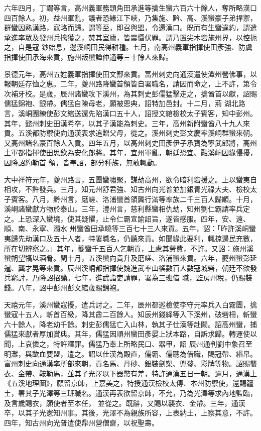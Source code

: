\begin{pinyinscope}
 六年四月，丁謂等言，高州義軍務頭角田承進等擒生蠻六百六十餘人，奪所略漢口四百餘人。初，益州軍亂，議者恐緣江下峽，乃集施、黔、高、溪蠻豪子弟捍禦，群蠻因熟漢路，寇略而歸。謂等至，即召與盟，令還漢口。既而有生蠻違約，謂遣承進率眾及發州兵擒獲之，焚其室廬，皆震懾伏罪。謂乃置尖木砦施州界，以控扼之，自是寇
 鈔始息，邊溪峒田民得耕種。七月，南高州義軍指揮使田彥強、防虞指揮使田承海來貢，施州叛蠻譚仲通等三十餘人來歸。



 景德元年，高州五姓義軍指揮使田文鄯來貢。富州刺史向通漢遣使潭州營佛事，以報朝廷存恤之惠。二年，夔州路降蠻首領皆自署職名，請因而命之，上不許，第令次補牙校。是歲，辰州諸蠻攻下溪州，為其刺史彭儒猛擊走之，擒酋首以獻，詔賜儒猛錦袍、銀帶。儒猛自陳母老，願被恩典，詔特加邑封。十二月，荊
 湖北路言，溪峒團練使彭文綰送還先陷漢口五十人，詔授文綰檢校太子賓客，知中彭州。其年，懿州刺史田漢希卒，以其子漢能為刺史。三年，高州新附蠻酋八十九人來貢。五溪都防禦使向通漢表求追贈父母，從之。溪州刺史彭文慶率溪峒群蠻來朝。又高州諸名豪百餘人入貢。四年五月，以高州刺史田彥伊子承寶為寧武郎將，高州土軍都指揮使田思欽為安化郎將。其年，宜州軍亂，朝廷恐宜、融溪峒因緣侵擾，因降詔約勒首
 領，皆奉詔，部分種族，無敢輒動。



 大中祥符元年，夔州路言，五團蠻嘯聚，謀劫高州，欲令暗利砦援之。上以蠻夷自相攻，不許發兵。三月，知元州舒君強、知古州向光普並加銀青光祿大夫、檢校太子賓客。八月，黔州言，磨嵯、洛浦蠻首領龔行滿等率族二千三百人歸順。十月，溪峒諸蠻獻方物於泰山。三年，澧州言，慈利縣蠻相仇劫，知州劉仁霸請率兵定之。上恐深入蠻境，使其疑懼，止令仁霸宣諭詔旨，遂皆感服。四年，安、遠、順、南、永寧、濁水
 州蠻酋田承曉等三百七十三人來貢。五年，詔：「昨許溪峒蠻夷歸先劫漢口及五十人者，特署職名，仍聽來貢。如聞緣此要利，輒掠邊民充數，所在切辨察之。」其年，夔蠻千五百人乞朝貢，上慮其勞費，不許。又詔：施州溪蠻朔望犒以酒肴。閏十月，五溪蠻向貴升及磨嵯、洛浦蠻來貢。六年，夔州蠻彭延暹、龔才晃等來貢。辰州溪峒都指揮使魏進武率山徭數百人數寇城砦，朝廷不欲發兵窮討，乃降詔招諭。七年，進武詣吏請罪，署為三班借
 職，監房州稅，仍賜裝錢。八年，詔中彭州彭文綰歲賜錦袍。



 天禧元年，溪州蠻寇擾，遣兵討之。二年，辰州都巡檢使李守元率兵入白霧團，擒蠻寇十五人，斬首百級，降其酋二百餘人。知辰州錢絳等入下溪州，破砦柵，斬蠻六十餘人，降老幼千餘。刺史彭儒猛亡入山林，執其子仕漢等赴闕。詔高州蠻，捕儒猛來獻者厚加賞典。其年，儒猛因順州蠻田彥晏上狀本路，自訴求歸。轉運使以聞，上哀憐之，特許釋罪。儒猛乃奉上所略民口、器甲，詔
 辰州通判劉中象召至明灘，與歃血要盟，遣之。詔以仕漢為殿直，儒霸、儒聰為借職，賜冠帶、緡帛。富州刺史向通漢率所部來朝，貢名馬、丹砂、銀裝劍槊、兜鍪、彩牌等物。詔賜襲衣、金帶、鞍勒馬，並其子光澤以下器幣有差，特許通漢五日一朝。逾月，通漢上《五溪地理圖》，願留京師，上嘉美之，特授通漢檢校太傅、本州防禦使，還賜疆土，署其子光澤等三班職名。通漢再表欲留京師，不允，乃為光澤等求內地監臨，及言歲賜衣，願使者至本任，
 並從之。既辭，又賜以襲衣、金帶。三年，通漢卒，以其子光憲知州事。其後，光澤不為親族所容，上表納土，上察其意，不許。四年，知古州向光普遣使鼎州營僧齋，以祝聖壽。




\end{pinyinscope}
